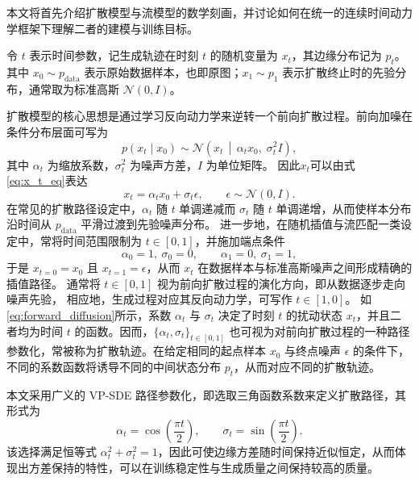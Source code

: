 本文将首先介绍扩散模型与流模型的数学刻画，并讨论如何在统一的连续时间动力学框架下理解二者的建模与训练目标。

令 $t$ 表示时间参数，记生成轨迹在时刻 $t$ 的随机变量为 $x_t$，其边缘分布记为 $p_t$。其中 $x_0 \sim p_{\mathrm{data}}$ 表示原始数据样本，也即原图；$x_1 \sim p_1$ 表示扩散终止时的先验分布，通常取为标准高斯 $\mathcal{N}(0,I)$。

扩散模型的核心思想是通过学习反向动力学来逆转一个前向扩散过程。前向加噪在条件分布层面可写为
\begin{equation}\label{eq:forward_diffusion}
p(x_t \mid x_0) \sim \mathcal{N}\!\left(x_t \,\middle|\, \alpha_t x_0,\; \sigma_t^2 I\right),
\end{equation}
其中 $\alpha_t$ 为缩放系数，$\sigma_t^2$ 为噪声方差，$I$ 为单位矩阵。
因此$x_t$可以由式\cref{eq:x_t_eq}表达
\begin{equation}\label{eq:x_t_eq}
x_t = \alpha_t x_0 + \sigma_t \epsilon,\qquad \epsilon \sim \mathcal{N}(0,I).
\end{equation}
在常见的扩散路径设定中，$\alpha_t$ 随 $t$ 单调递减而 $\sigma_t$ 随 $t$ 单调递增，从而使样本分布沿时间从 $p_{\mathrm{data}}$ 平滑过渡到先验噪声分布。
进一步地，在随机插值与流匹配一类设定中，常将时间范围限制为 $t \in [0,1]$，并施加端点条件
\[
\alpha_0 = 1,\ \sigma_0 = 0,\qquad \alpha_1 = 0,\ \sigma_1 = 1,
\]
于是 $x_{t=0}=x_0$ 且 $x_{t=1}=\epsilon$，从而 $x_t$ 在数据样本与标准高斯噪声之间形成精确的插值路径。
通常将 $t \in [0,1]$ 视为前向扩散过程的演化方向，即从数据逐步走向噪声先验，
相应地，生成过程对应其反向动力学，可写作 $t \in [1,0]$。
如\cref{eq:forward_diffusion}所示，系数 $\alpha_t$ 与 $\sigma_t$ 决定了时刻 $t$ 的扰动状态 $x_t$，并且二者均为时间 $t$ 的函数。因而，$\{\alpha_t,\sigma_t\}_{t\in[0,1]}$ 也可视为对前向扩散过程的一种路径参数化，常被称为扩散轨迹。在给定相同的起点样本 $x_0$ 与终点噪声 $\epsilon$ 的条件下，不同的系数函数将诱导不同的中间状态分布 $p_t$，从而对应不同的扩散轨迹。

本文采用广义的 VP-SDE 路径参数化，即选取三角函数系数来定义扩散路径，其形式为
\[
\alpha_t = \cos\!\left(\frac{\pi t}{2}\right), \qquad 
\sigma_t = \sin\!\left(\frac{\pi t}{2}\right).
\]
该选择满足恒等式 $\alpha_t^2+\sigma_t^2=1$，因此可使边缘方差随时间保持近似恒定，从而体现出方差保持的特性，可以在训练稳定性与生成质量之间保持较高的质量。

